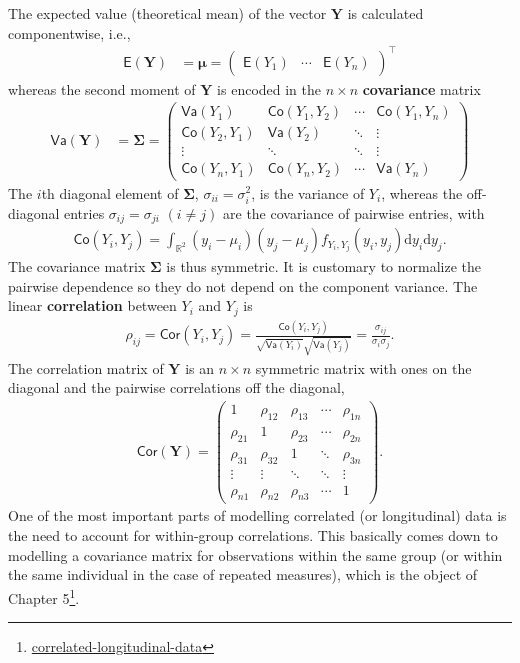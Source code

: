 \documentclass[
  11pt,
  letterpaper,
]{book}
\renewcommand{\href}[2]{#2\footnote{\url{#1}}}
\theoremstyle{definition}
\theoremstyle{definition}
\theoremstyle{definition}
\theoremstyle{definition}
\theoremstyle{remark}
\begin{document}
The expected value (theoretical mean) of the vector \(\boldsymbol{Y}\) is calculated componentwise, i.e.,
\begin{align*}
\mathsf{E}(\boldsymbol{Y}) &= \boldsymbol{\mu}=
\begin{pmatrix}
\mathsf{E}(Y_1) &
\cdots  &
\mathsf{E}(Y_n)
\end{pmatrix}^\top
\end{align*}
whereas the second moment of \(\boldsymbol{Y}\) is encoded in the \(n \times n\) \textbf{covariance} matrix
\begin{align*}
\mathsf{Va}(\boldsymbol{Y}) &= \boldsymbol{\Sigma} = \begin{pmatrix} \mathsf{Va}(Y_1) & \mathsf{Co}(Y_1, Y_2)  & \cdots & \mathsf{Co}(Y_1, Y_n) \\
\mathsf{Co}(Y_2, Y_1) & \mathsf{Va}(Y_2) & \ddots & \vdots \\
\vdots & \ddots & \ddots & \vdots \\
\mathsf{Co}(Y_n, Y_1) & \mathsf{Co}(Y_n, Y_2) &\cdots & \mathsf{Va}(Y_n)
\end{pmatrix}
\end{align*}
The \(i\)th diagonal element of \(\boldsymbol{\Sigma}\), \(\sigma_{ii}=\sigma_i^2\), is the variance of \(Y_i\), whereas the off-diagonal entries \(\sigma_{ij}=\sigma_{ji}\) \((i \neq j)\) are the covariance of pairwise entries, with
\begin{align*}
\mathsf{Co}(Y_i, Y_j) = \int_{\mathbb{R}^2} (y_i-\mu_i)(y_j-\mu_j) f_{Y_i, Y_j}(y_i, y_j) \mathrm{d} y_i \mathrm{d} y_j.
\end{align*}
The covariance matrix \(\boldsymbol{\Sigma}\) is thus symmetric. It is customary to normalize the pairwise dependence so they do not depend on the component variance. The linear \textbf{correlation} between \(Y_i\) and \(Y_j\) is
\begin{align*}
\rho_{ij}=\mathsf{Cor}(Y_i,Y_j)=\frac{\mathsf{Co}(Y_i, Y_j)}{\sqrt{\mathsf{Va}(Y_i)}\sqrt{\mathsf{Va}(Y_j)}}=\frac{\sigma_{ij}}{\sigma_i\sigma_j}.
\end{align*}
The correlation matrix of \(\boldsymbol{Y}\) is an
\(n\times n\) symmetric matrix with ones on the diagonal and the pairwise correlations off the diagonal,
\begin{align*}
\mathsf{Cor}(\boldsymbol{Y})=
\begin{pmatrix}
1 & \rho_{12} & \rho_{13} & \cdots & \rho_{1n}\\
\rho_{21} & 1 & \rho_{23} & \cdots & \rho_{2n} \\
\rho_{31} & \rho_{32} & 1 & \ddots & \rho_{3n} \\
\vdots & \vdots & \ddots & \ddots & \vdots \\
\rho_{n1} & \rho_{n2} & \rho_{n3} & \cdots & 1
\end{pmatrix}.
\end{align*}
One of the most important parts of modelling
correlated (or longitudinal) data is the need to account for within-group correlations. This basically comes down to modelling a covariance matrix for observations within the same group (or within the same individual in the case of repeated measures), which is the object of \href{correlated-longitudinal-data}{Chapter 5}.
\end{document}
